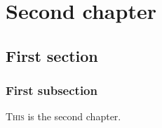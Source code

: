 \chapter{Second chapter}
\label{chap:second}

\section{First section}
\label{sec:chap-second-first}

\subsection{First subsection}
\label{subsec:chap-second-first}

\lettrine{T}{his} is the second chapter.

